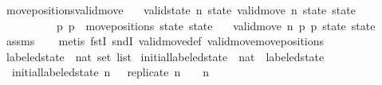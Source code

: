 \begin{isabellebody}
\isamarkupfalse%
%
\endisatagproof
{\isafoldproof}%
%
\isadelimproof
\isanewline
%
\endisadelimproof
\isanewline
{}\isamarkupfalse%
\ move{\isacharunderscore}positions{\isacharunderscore}valid{\isacharunderscore}move{\isacharprime}{\isacharcolon}\isanewline
\ \ \ {\isachardoublequoteopen}valid{\isacharunderscore}state\ n\ state{\isachardoublequoteclose}\ {\isachardoublequoteopen}valid{\isacharunderscore}move\ n\ state\ state{\isacharprime}{\isachardoublequoteclose}\isanewline
\ \ \ \ \ \ \ \ \ \ {\isachardoublequoteopen}{\isacharparenleft}p{}{\isacharcomma}\ p{}{\isacharparenright}\ {\isacharequal}\ move{\isacharunderscore}positions\ state\ state{\isacharprime}{\isachardoublequoteclose}\isanewline
\ \ \ {\isachardoublequoteopen}valid{\isacharunderscore}move{\isacharprime}\ n\ p{}\ p{}\ state\ state{\isacharprime}{\isachardoublequoteclose}\isanewline
%
\isadelimproof
\ \ %
\endisadelimproof
%
\isatagproof
{}\isamarkupfalse%
\ assms\isanewline
\ \ \isamarkupfalse%
\ {\isacharparenleft}metis\ fstI\ sndI\ valid{\isacharunderscore}move{\isacharunderscore}def\ valid{\isacharunderscore}move{\isacharprime}{\isacharunderscore}move{\isacharunderscore}positions{\isacharparenright}%
\endisatagproof
{\isafoldproof}%
%
\isadelimproof
%
\endisadelimproof
%
\isadelimdocument
%
\endisadelimdocument
%
\isatagdocument
%
\isamarkuptrue%
%
\endisatagdocument
{\isafolddocument}%
%
\isadelimdocument
%
\endisadelimdocument
{}\isamarkupfalse%
\ labeled{\isacharunderscore}state\ {\isacharequal}\ {\isachardoublequoteopen}{\isacharparenleft}nat\ set{\isacharparenright}\ list{\isachardoublequoteclose}\isanewline
\isanewline
{}\isamarkupfalse%
\ initial{\isacharunderscore}labeled{\isacharunderscore}state\ {\isacharcolon}{\isacharcolon}\ {\isachardoublequoteopen}nat\ {\isasymRightarrow}\ labeled{\isacharunderscore}state{\isachardoublequoteclose}\ \isanewline
\ \ {\isachardoublequoteopen}initial{\isacharunderscore}labeled{\isacharunderscore}state\ n\ \ {\isacharequal}\ {\isacharparenleft}replicate\ {\isacharparenleft}n{\isacharplus}{}{\isacharparenright}\ {\isacharbraceleft}{\isacharbraceright}{\isacharparenright}\ {\isacharbrackleft}{}\ {\isacharcolon}{\isacharequal}\ {\isacharbraceleft}{}{\isachardot}{\isachardot}{\isacharless}n{\isacharbraceright}{\isacharbrackright}{\isachardoublequoteclose}\isanewline

\end{isabellebody}
